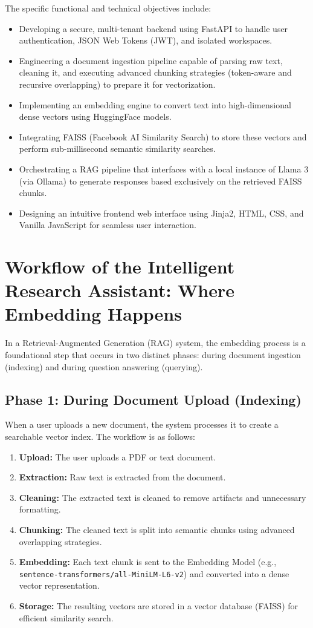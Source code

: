 \documentclass[12pt, a4paper]{report}
\begin{document}
The specific functional and technical objectives include:
\begin{itemize}
    \item Developing a secure, multi-tenant backend using FastAPI to handle user authentication, JSON Web Tokens (JWT), and isolated workspaces.
    \item Engineering a document ingestion pipeline capable of parsing raw text, cleaning it, and executing advanced chunking strategies (token-aware and recursive overlapping) to prepare it for vectorization.
    \item Implementing an embedding engine to convert text into high-dimensional dense vectors using HuggingFace models.
    \item Integrating FAISS (Facebook AI Similarity Search) to store these vectors and perform sub-millisecond semantic similarity searches.
    \item Orchestrating a RAG pipeline that interfaces with a local instance of Llama 3 (via Ollama) to generate responses based exclusively on the retrieved FAISS chunks.
    \item Designing an intuitive frontend web interface using Jinja2, HTML, CSS, and Vanilla JavaScript for seamless user interaction.
\end{itemize}

\section{Workflow of the Intelligent Research Assistant: Where Embedding Happens}

In a Retrieval-Augmented Generation (RAG) system, the embedding process is a foundational step that occurs in two distinct phases: during document ingestion (indexing) and during question answering (querying).

\subsection{Phase 1: During Document Upload (Indexing)}
When a user uploads a new document, the system processes it to create a searchable vector index. The workflow is as follows:
\begin{enumerate}
    \item \textbf{Upload:} The user uploads a PDF or text document.
    \item \textbf{Extraction:} Raw text is extracted from the document.
    \item \textbf{Cleaning:} The extracted text is cleaned to remove artifacts and unnecessary formatting.
    \item \textbf{Chunking:} The cleaned text is split into semantic chunks using advanced overlapping strategies.
    \item \textbf{Embedding:} Each text chunk is sent to the Embedding Model (e.g., \texttt{sentence-transformers/all-MiniLM-L6-v2}) and converted into a dense vector representation.
    \item \textbf{Storage:} The resulting vectors are stored in a vector database (FAISS) for efficient similarity search.
\end{enumerate}
\end{document}

